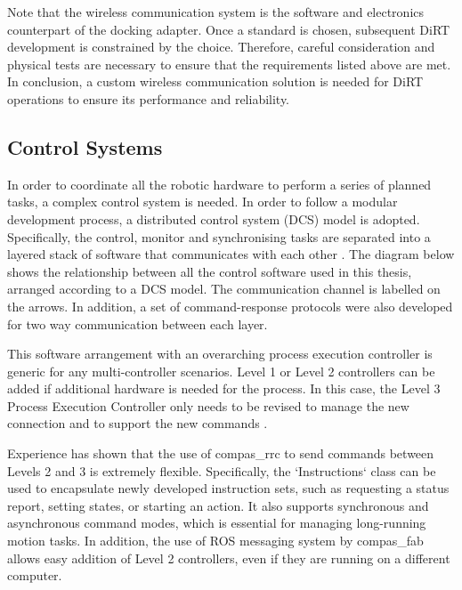 Note that the wireless communication system is the software and electronics counterpart of the docking adapter. Once a standard is chosen, subsequent DiRT development is constrained by the choice. Therefore, careful consideration and physical tests are necessary to ensure that the requirements listed above are met. In conclusion, a custom wireless communication solution is needed for DiRT operations to ensure its performance and reliability.

\subsection{Control Systems}
\label{subsection:discussion-control-systems}

In order to coordinate all the robotic hardware to perform a series of planned tasks, a complex control system is needed. In order to follow a modular development process, a distributed control system (DCS) model is adopted. Specifically, the control, monitor and synchronising tasks are separated into a layered stack of software that communicates with each other . The diagram below shows the relationship between all the control software used in this thesis, arranged according to a DCS model. The communication channel is labelled on the arrows. In addition, a set of command-response protocols were also developed for two way communication between each layer. 



This software arrangement with an overarching process execution controller is generic for any multi-controller scenarios. Level 1 or Level 2 controllers can be added if additional hardware is needed for the process. In this case, the Level 3 Process Execution Controller only needs to be revised to manage the new connection and to support the new commands . 

Experience has shown that the use of compas\_rrc \parencite{fleischmannCOMPASRRCOnline2020} to send commands between Levels 2 and 3 is extremely flexible. Specifically, the `Instructions` class can be used to encapsulate newly developed instruction sets, such as requesting a status report, setting states, or starting an action. It also supports synchronous and asynchronous command modes, which is essential for managing long-running motion tasks. In addition, the use of ROS messaging system by compas\_fab allows easy addition of Level 2 controllers, even if they are running on a different computer. 

